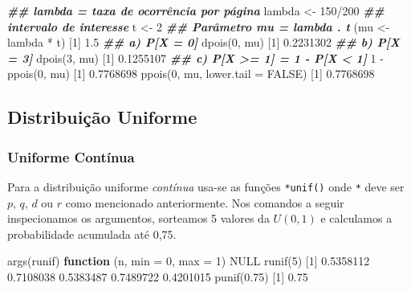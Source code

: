\documentclass[
  10pt,
  a4paper]{book}
\newenvironment{Shaded}{\begin{snugshade}}{\end{snugshade}}
\newcommand{\AttributeTok}[1]{\textcolor[rgb]{0.77,0.63,0.00}{#1}}
\newcommand{\ConstantTok}[1]{\textcolor[rgb]{0.00,0.00,0.00}{#1}}
\newcommand{\ControlFlowTok}[1]{\textcolor[rgb]{0.13,0.29,0.53}{\textbf{#1}}}
\newcommand{\DecValTok}[1]{\textcolor[rgb]{0.00,0.00,0.81}{#1}}
\newcommand{\DocumentationTok}[1]{\textcolor[rgb]{0.56,0.35,0.01}{\textbf{\textit{#1}}}}
\newcommand{\FloatTok}[1]{\textcolor[rgb]{0.00,0.00,0.81}{#1}}
\newcommand{\FunctionTok}[1]{\textcolor[rgb]{0.00,0.00,0.00}{#1}}
\newcommand{\NormalTok}[1]{#1}
\newcommand{\OtherTok}[1]{\textcolor[rgb]{0.56,0.35,0.01}{#1}}
\newcommand{\SpecialCharTok}[1]{\textcolor[rgb]{0.00,0.00,0.00}{#1}}
\begin{document}
\begin{Shaded}
\begin{Highlighting}[]
\DocumentationTok{\#\# lambda = taxa de ocorrência por página}
\NormalTok{lambda }\OtherTok{\textless{}{-}} \DecValTok{150}\SpecialCharTok{/}\DecValTok{200}
\DocumentationTok{\#\# intervalo de interesse}
\NormalTok{t }\OtherTok{\textless{}{-}} \DecValTok{2}
\DocumentationTok{\#\# Parâmetro mu = lambda . t}
\NormalTok{(mu }\OtherTok{\textless{}{-}}\NormalTok{ lambda }\SpecialCharTok{*}\NormalTok{ t)}
\NormalTok{[}\DecValTok{1}\NormalTok{] }\FloatTok{1.5}
\DocumentationTok{\#\# a) P[X = 0]}
\FunctionTok{dpois}\NormalTok{(}\DecValTok{0}\NormalTok{, mu)}
\NormalTok{[}\DecValTok{1}\NormalTok{] }\FloatTok{0.2231302}
\DocumentationTok{\#\# b) P[X = 3]}
\FunctionTok{dpois}\NormalTok{(}\DecValTok{3}\NormalTok{, mu)}
\NormalTok{[}\DecValTok{1}\NormalTok{] }\FloatTok{0.1255107}
\DocumentationTok{\#\# c) P[X \textgreater{}= 1] = 1 {-} P[X \textless{} 1]}
\DecValTok{1} \SpecialCharTok{{-}} \FunctionTok{ppois}\NormalTok{(}\DecValTok{0}\NormalTok{, mu)}
\NormalTok{[}\DecValTok{1}\NormalTok{] }\FloatTok{0.7768698}
\FunctionTok{ppois}\NormalTok{(}\DecValTok{0}\NormalTok{, mu, }\AttributeTok{lower.tail =} \ConstantTok{FALSE}\NormalTok{)}
\NormalTok{[}\DecValTok{1}\NormalTok{] }\FloatTok{0.7768698}
\end{Highlighting}
\end{Shaded}

\hypertarget{distribuiuxe7uxe3o-uniforme}{%
\subsection{Distribuição Uniforme}\label{distribuiuxe7uxe3o-uniforme}}

\hypertarget{uniforme-contuxednua}{%
\subsubsection{Uniforme Contínua}\label{uniforme-contuxednua}}

Para a distribuição uniforme \emph{contínua} usa-se as funções \texttt{*unif()} onde
\texttt{*} deve ser \(p\), \(q\), \(d\) ou \(r\) como mencionado anteriormente. Nos
comandos a seguir inspecionamos os argumentos, sorteamos 5 valores da
\(U(0,1)\) e calculamos a probabilidade acumulada até 0,75.

\begin{Shaded}
\begin{Highlighting}[]
\FunctionTok{args}\NormalTok{(runif)}
\ControlFlowTok{function}\NormalTok{ (n, }\AttributeTok{min =} \DecValTok{0}\NormalTok{, }\AttributeTok{max =} \DecValTok{1}\NormalTok{) }
\ConstantTok{NULL}
\FunctionTok{runif}\NormalTok{(}\DecValTok{5}\NormalTok{)}
\NormalTok{[}\DecValTok{1}\NormalTok{] }\FloatTok{0.5358112} \FloatTok{0.7108038} \FloatTok{0.5383487} \FloatTok{0.7489722} \FloatTok{0.4201015}
\FunctionTok{punif}\NormalTok{(}\FloatTok{0.75}\NormalTok{)}
\NormalTok{[}\DecValTok{1}\NormalTok{] }\FloatTok{0.75}
\end{Highlighting}
\end{Shaded}
\end{document}
